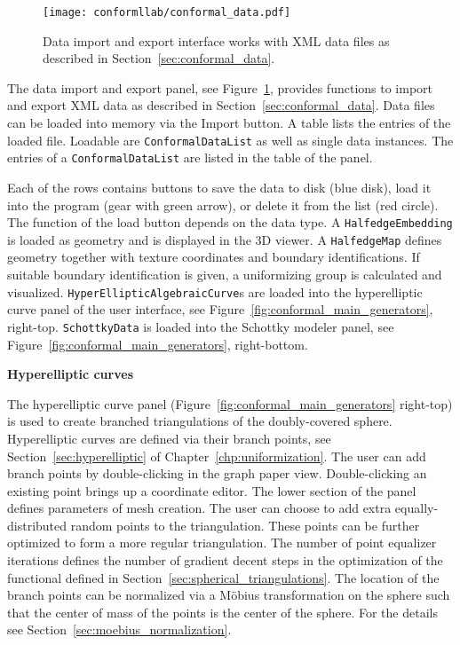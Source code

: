 \documentclass[Thesis.tex]{subfiles}
\begin{document}
\begin{figure}
\centering
\texttt{[image: conformllab/conformal\_data.pdf]}
\caption{Data import and export interface works with XML data files as described in 
Section~\ref{sec:conformal_data}.}
\label{fig:data_interface}
\end{figure}

The data import and export panel, see Figure~\ref{fig:data_interface}, provides functions to import and export XML data as described in Section~\ref{sec:conformal_data}.  
Data files can be loaded into memory via the Import button. A table lists the entries of the loaded file.  
Loadable are {\tt ConformalDataList} as well as single data instances. 
The entries of a {\tt ConformalDataList} are listed in the table of the panel. 

Each of the rows contains buttons to save the data to disk (blue disk), load it into the program (gear with green arrow), or delete it from the list (red circle).  
The function of the load button depends on the data type. 
A {\tt HalfedgeEmbedding} is loaded as geometry and is displayed in the 3D viewer. 
A {\tt HalfedgeMap} defines geometry together with texture coordinates and boundary identifications. 
If suitable boundary identification is given, a uniformizing group is calculated and visualized. 
{\tt HyperEllipticAlgebraicCurve}s are loaded into the hyperelliptic curve panel of the user interface, see Figure~\ref{fig:conformal_main_generators}, right-top.  
{\tt SchottkyData} is loaded into the Schottky modeler panel, see Figure~\ref{fig:conformal_main_generators}, right-bottom.


{\bf Hyperelliptic curves}
\nopagebreak

The hyperelliptic curve panel (Figure~\ref{fig:conformal_main_generators} right-top) is used to create branched triangulations of the doubly-covered sphere.
Hyperelliptic curves are defined via their branch points, see Section~\ref{sec:hyperelliptic} of Chapter~\ref{chp:uniformization}.
The user can add branch points by double-clicking in the graph paper view.
Double-clicking an existing point brings up a coordinate editor. 
The lower section of the panel defines parameters of mesh creation. 
The user can choose to add extra equally-distributed random points to the triangulation.
These points can be further optimized to form a more regular triangulation.
The number of point equalizer iterations defines the number of gradient decent steps in the optimization of the functional defined in Section~\ref{sec:spherical_triangulations}.
The location of the branch points can be normalized via a M{\"o}bius transformation on the sphere such that the center of mass of the points is the center of the sphere. For the details see Section~\ref{sec:moebius_normalization}.
\end{document}
